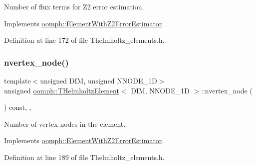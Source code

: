 Number of \textquotesingle{}flux\textquotesingle{} terms for Z2 error estimation. 



Implements \hyperlink{classoomph_1_1ElementWithZ2ErrorEstimator_ae82c5728902e13da31be19c390fc28e3}{oomph\+::\+Element\+With\+Z2\+Error\+Estimator}.



Definition at line 172 of file Thelmholtz\+\_\+elements.\+h.

\mbox{\label{classoomph_1_1THelmholtzElement_af2725bbd8764cb649232a2577acd9df2}} 
\subsubsection{\texorpdfstring{nvertex\+\_\+node()}{nvertex\_node()}}
{\footnotesize\ttfamily template$<$unsigned D\+IM, unsigned N\+N\+O\+D\+E\+\_\+1D$>$ \\
unsigned \hyperlink{classoomph_1_1THelmholtzElement}{oomph\+::\+T\+Helmholtz\+Element}$<$ D\+IM, N\+N\+O\+D\+E\+\_\+1D $>$\+::nvertex\+\_\+node (\begin{DoxyParamCaption}{ }\end{DoxyParamCaption}) const\hspace{0.3cm}{\ttfamily [inline]}, {\ttfamily [protected]}, {\ttfamily [virtual]}}



Number of vertex nodes in the element. 



Implements \hyperlink{classoomph_1_1ElementWithZ2ErrorEstimator_a19495a0e77ef4ff35f15fdf7913b4077}{oomph\+::\+Element\+With\+Z2\+Error\+Estimator}.



Definition at line 189 of file Thelmholtz\+\_\+elements.\+h.

\mbox{\label{classoomph_1_1THelmholtzElement_a563752a21a9e84091bd5c6c8c5a3e750}} 
